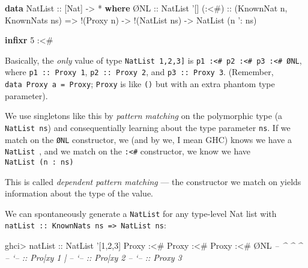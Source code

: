 \documentclass[]{article}
\newenvironment{Shaded}{}{}
\newcommand{\KeywordTok}[1]{\textcolor[rgb]{0.00,0.44,0.13}{\textbf{{#1}}}}
\newcommand{\DataTypeTok}[1]{\textcolor[rgb]{0.56,0.13,0.00}{{#1}}}
\newcommand{\DecValTok}[1]{\textcolor[rgb]{0.25,0.63,0.44}{{#1}}}
\newcommand{\CharTok}[1]{\textcolor[rgb]{0.25,0.44,0.63}{{#1}}}
\newcommand{\CommentTok}[1]{\textcolor[rgb]{0.38,0.63,0.69}{\textit{{#1}}}}
\newcommand{\OtherTok}[1]{\textcolor[rgb]{0.00,0.44,0.13}{{#1}}}
\newcommand{\FunctionTok}[1]{\textcolor[rgb]{0.02,0.16,0.49}{{#1}}}
\newcommand{\NormalTok}[1]{{#1}}
\begin{document}
\begin{Shaded}
\begin{Highlighting}[]
\KeywordTok{data} \DataTypeTok{NatList}\OtherTok{ ::} \NormalTok{[}\DataTypeTok{Nat}\NormalTok{] }\OtherTok{->} \FunctionTok{*} \KeywordTok{where}
    \NormalTok{Ø}\DataTypeTok{NL}\OtherTok{   ::} \DataTypeTok{NatList} \CharTok{'[]}
\OtherTok{    (:<#) ::} \NormalTok{(}\DataTypeTok{KnownNat} \NormalTok{n, }\DataTypeTok{KnownNats} \NormalTok{ns)}
          \OtherTok{=>} \FunctionTok{!}\NormalTok{(}\DataTypeTok{Proxy} \NormalTok{n) }\OtherTok{->} \FunctionTok{!}\NormalTok{(}\DataTypeTok{NatList} \NormalTok{ns) }\OtherTok{->} \DataTypeTok{NatList} \NormalTok{(n }\CharTok{': ns)}

\KeywordTok{infixr} \DecValTok{5} \FunctionTok{:<#}
\end{Highlighting}
\end{Shaded}

Basically, the \emph{only} value of type
\texttt{NatList\ \textquotesingle{}{[}1,2,3{]}} is
\texttt{p1\ :\textless{}\#\ p2\ :\textless{}\#\ p3\ :\textless{}\#\ ØNL}, where
\texttt{p1\ ::\ Proxy\ 1}, \texttt{p2\ ::\ Proxy\ 2}, and
\texttt{p3\ ::\ Proxy\ 3}. (Remember, \texttt{data\ Proxy\ a\ =\ Proxy};
\texttt{Proxy} is like \texttt{()} but with an extra phantom type parameter).

We use singletons like this by \emph{pattern matching} on the polymorphic type
(a \texttt{NatList\ ns}) and consequentially learning about the type parameter
\texttt{ns}. If we match on the \texttt{ØNL} constructor, we (and by we, I mean
GHC) knows we have a \texttt{NatList\ \textquotesingle{}{[}{]}}, and we match on
the \texttt{:\textless{}\#} constructor, we know we have
\texttt{NatList\ (n\ \textquotesingle{}:\ ns)}

This is called \emph{dependent pattern matching} --- the constructor we match on
yields information about the type of the value.

We can spontaneously generate a \texttt{NatList} for any type-level Nat list
with \texttt{natList\ ::\ KnownNats\ ns\ =\textgreater{}\ NatList\ ns}:

\begin{Shaded}
\begin{Highlighting}[]
\NormalTok{ghci}\FunctionTok{>}\OtherTok{ natList ::} \DataTypeTok{NatList} \CharTok{'[1,2,3]}
\DataTypeTok{Proxy} \FunctionTok{:<#} \DataTypeTok{Proxy} \FunctionTok{:<#} \DataTypeTok{Proxy} \FunctionTok{:<#} \NormalTok{Ø}\DataTypeTok{NL}
\CommentTok{-- ^         ^         ^}
\CommentTok{-- `-- :: Pro|xy 1     |}
\CommentTok{--           `-- :: Pro|xy 2}
\CommentTok{--                     `-- :: Proxy 3}
\end{Highlighting}
\end{Shaded}
\end{document}
